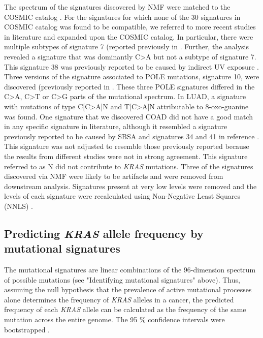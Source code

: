\documentclass[english, 12pt, letterpaper]{article}
\newcommand{\KRAS}{\emph{KRAS}}
\begin{document}
The spectrum of the signatures discovered by NMF were matched to the COSMIC catalog \cite{Tate2019}.
For the signatures for which none of the 30 signatures in COSMIC catalog was found to be compatible, we referred to more recent studies in literature and expanded upon the COSMIC catalog. 
In particular, there were multiple subtypes of signature 7 (reported previously in \cite{Hayward2017Whole-genomeSubtypes., Alexandrov2018TheCancer}.
Further, the analysis revealed a signature that was dominantly C>A but not a subtype of signature 7.
This signature 38 was previously reported to be caused by indirect UV exposure \cite{Alexandrov2018TheCancer}. 
Three versions of the signature associated to POLE mutations, signature 10, were discovered (previously reported in \cite{Alexandrov2018TheCancer}.
These three POLE signatures differed in the C>A, C>T or C>G parts of the mutational spectrum. 
In LUAD, a signature with mutations of type C[C>A]N and T[C>A]N attributable to 8-oxo-guanine \cite{Alexandrov2018TheCancer} was found. 
One signature that we discovered COAD did not have a good match in any specific signature in literature, although it resembled a signature previously reported to be caused by SBSA \cite{Lee-Six2019} and signatures 34 and 41 in reference \cite{Alexandrov2018TheCancer}. 
This signature was not adjusted to resemble those previously reported because the results from different studies were not in strong agreement.
This signature referred to as N did not contribute to \KRAS{} mutations.
Three of the signatures discovered via NMF were likely to be artifacts \cite{Costello2013DiscoveryPreparation.} and were removed from downstream analysis. 
Signatures present at very low levels were removed and the levels of each signature were recalculated using Non-Negative Least Squares (NNLS) \cite{Gulhan2019DetectingSamples.}.


\subsection*{Predicting \KRAS{} allele frequency by mutational signatures}

The mutational signatures are linear combinations of the 96-dimension spectrum of possible mutations (see "Identifying mutational signatures" above).
Thus, assuming the null hypothesis that the prevalence of active mutational processes alone determines the frequency of \KRAS{} alleles in a cancer, the predicted frequency of each \KRAS{} allele can be calculated as the frequency of the same mutation across the entire genome.
The 95 \% confidence intervals were bootstrapped \cite{R-boot}.
\end{document}
